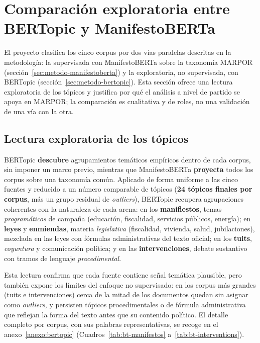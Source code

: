 \section{Comparación exploratoria entre BERTopic y ManifestoBERTa}
\label{sec:res-bertopic}

El proyecto clasifica los cinco corpus por dos vías paralelas descritas en la
metodología: la supervisada con ManifestoBERTa \cite{manifestoberta2024} sobre la
taxonomía MARPOR (sección~\ref{sec:metodo-manifestoberta}) y la exploratoria, no
supervisada, con BERTopic \cite{grootendorst2022bertopic}
(sección~\ref{sec:metodo-bertopic}). Esta sección ofrece una lectura exploratoria
de los tópicos y justifica por qué el análisis a nivel de partido se apoya en
MARPOR; la comparación es cualitativa y de roles, no una validación de una vía
con la otra.

\subsection{Lectura exploratoria de los tópicos}
\label{sec:res-bt-lectura}

BERTopic \textbf{descubre} agrupamientos temáticos empíricos dentro de cada
corpus, sin imponer un marco previo, mientras que ManifestoBERTa \textbf{proyecta}
todos los corpus sobre una taxonomía común. Aplicado de forma uniforme a las
cinco fuentes y reducido a un número comparable de tópicos (\textbf{24 tópicos
finales por corpus}, más un grupo residual de \emph{outliers}), BERTopic
recupera agrupaciones coherentes con la naturaleza de cada arena: en los
\textbf{manifiestos}, temas \emph{programáticos} de campaña (educación,
fiscalidad, servicios públicos, energía); en \textbf{leyes} y \textbf{enmiendas},
materia \emph{legislativa} (fiscalidad, vivienda, salud, jubilaciones), mezclada
en las leyes con fórmulas administrativas del texto oficial; en los \textbf{tuits},
\emph{coyuntura} y comunicación política; y en las \textbf{intervenciones}, debate
sustantivo con tramos de lenguaje \emph{procedimental}.

Esta lectura confirma que cada fuente contiene señal temática plausible, pero
también expone los límites del enfoque no supervisado: en los corpus más grandes
(tuits e intervenciones) cerca de la mitad de los documentos quedan sin
asignar como \emph{outliers}, y persisten tópicos procedimentales o de fórmula
administrativa que reflejan la forma del texto antes que su contenido político. El
detalle completo por corpus, con sus palabras representativas, se recoge en el
anexo~\ref{anexo:bertopic} (Cuadros~\ref{tab:bt-manifestos}
a~\ref{tab:bt-interventions}).


